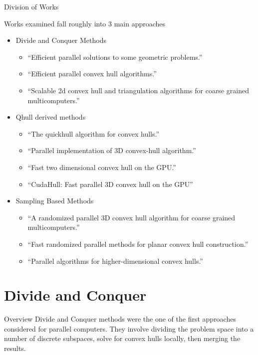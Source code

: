 \documentclass[11pt]{beamer}
\begin{document}
\begin{frame}{Division of Works}

Works examined fall roughly into 3 main approaches
\begin{itemize}
\item{ Divide and Conquer Methods}
\begin{itemize}
\item{``Efficient parallel solutions to some geometric problems.''}
\item{``Efficient parallel convex hull algorithms.''}
\item{ ``Scalable 2d convex hull and triangulation algorithms for coarse grained multicomputers.''}

\end{itemize}
\item{ Qhull derived methods}
\begin{itemize}
\item{``The quickhull algorithm for convex hulls.''}
\item{ ``Parallel implementation of 3D convex-hull algorithm.''}
\item{``Fast two dimensional convex hull on the GPU.''}
\item{``CudaHull: Fast parallel 3D convex hull on the GPU''}
\end{itemize}
\item{ Sampling Based Methods}
\begin{itemize}
\item{``A randomized parallel 3D convex hull algorithm for coarse grained multicomputers.''}
\item{ ``Fast randomized parallel methods for planar convex hull construction.''}
\item{``Parallel algorithms for higher-dimensional convex hulls.''}
\end{itemize}

\end{itemize}

\end{frame}




\section{Divide and Conquer}
\begin{frame}{Overview}
Divide and Conquer methods were the one of the first approaches considered for parallel computers.
They involve dividing the problem space into a number of discrete subspaces, solve for convex hulls locally, then merging the results.
\end{frame}
\end{document}
